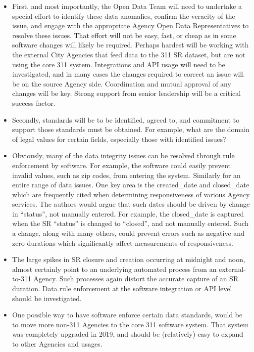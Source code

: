 \documentclass[12pt, titlepage]{article}
\begin{document}
\begin{itemize}
	\item First, and most importantly, the Open Data Team will need 
	to undertake a special effort to identify these data anomalies, confirm 
	the veracity of the issue, and engage with the appropriate Agency 
	Open Data Representatives to resolve these issues. That effort will 
	not be easy, fast, or cheap as in some software changes will likely 
	be required. Perhaps hardest will be working with the external City 
	Agencies that feed data to the 311 SR dataset, but are not using 
	the core 311 system. Integrations and API usage will need to be 
	investigated, and in many cases the changes required to correct 
	an issue will be on the source Agency side. Coordination and 
	mutual approval of any changes will be key. Strong support from 
	senior 	leadership will be a critical success factor.

	\item Secondly, standards will be to be identified, agreed to, and 
	commitment to support those standards must be obtained. For 
	example, what are the domain of legal values for certain fields, 
	especially those with identified issues?

	\item Obviously, many of the data integrity issues can be 
	resolved through rule enforcement by software. For example, the 
	software could easily prevent invalid values, such as zip codes, from 
	entering the system. Similarly for an entire range of data issues. One 
	key area is the created\_date and closed\_date which are frequently 
	cited when determining responsiveness of various Agency services. The 
	authors would argue that such dates should be driven by change 
	in ``status'', not manually entered. For example, the closed\_date 
	is captured when the SR ``status'' is changed to ``closed'', and 
	not manually entered. Such a change, along with many others, could 
	prevent errors such as negative and  zero durations which 
	significantly affect measurements of responsiveness. 
	
	\item The large spikes in SR closure and creation occurring at 
	midnight and noon, almost certainly point to an underlying automated 
	process from an external-to-311 Agency. Such processes again distort 
	the accurate capture of an SR duration. Data rule enforcement at the 
	software integration or API level should be investigated.

	\item One possible way to have software enforce certain data 
	standards, would be to move more non-311 Agencies to the core 
	311 software system. That system was completely upgraded in 
	2019, and should be (relatively) easy to expand to other 
	Agencies and usages.
	

\end{itemize}
\end{document}
